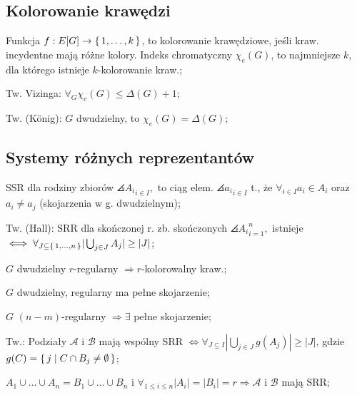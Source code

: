 \subsection{Kolorowanie krawędzi}

Funkcja $f: E[G] \rightarrow \set{1, \dots, k}$, to kolorowanie krawędziowe,
  jeśli kraw. incydentne mają różne kolory. Indeks chromatyczny $\chi_e(G)$, to
  najmniejsze $k$, dla którego istnieje $k$-kolorowanie kraw.;

Tw. Vizinga: $\forall_G \chi_e(G) \leq \Delta(G) +1$;

Tw. (K{\"o}nig): $G$ dwudzielny, to $\chi_e(G) = \Delta(G)$;

\subsection{Systemy różnych reprezentantów}

SSR dla rodziny zbiorów $\angles{A_i}_{i\in I},$ to ciąg elem.
  $\angles{a_i}_{i\in I}$ t., że
  $\forall_{i\in I} a_i \in A_i$ oraz $a_i \neq a_j$
  (skojarzenia w g. dwudzielnym);

Tw. (Hall): SRR dla skończonej r. zb. skończonych $\angles{A_i}_{i=1}^n,$
  istnieje
  $\iff \forall_{J\subseteq\set{1,\dots,n}} |\bigcup_{j\in J}A_j| \geq |J|$;

$G$ dwudzielny $r$-regularny $\Rightarrow r$-kolorowalny kraw.;

$G$ dwudzielny, regularny ma pełne skojarzenie;

$G$ $(n-m)$-regularny $\Rightarrow \exists$ pełne skojarzenie;

Tw.: Podziały $\mathcal{A}$ i $\mathcal{B}$ mają wspólny SRR $\Leftrightarrow
  \forall_{J\subseteq I} |\bigcup_{j\in J}g(A_j)| \geq |J|$, gdzie
  $g(C) = \set{j | C \cap B_j \neq \emptyset}$;

$A_1 \cup \dots \cup A_n = B_1 \cup \dots \cup B_n$ i
  $\forall_{1 \leq i \leq n}|A_i| = |B_i| =r \Rightarrow \mathcal{A}$ i
  $\mathcal{B}$ mają SRR;

